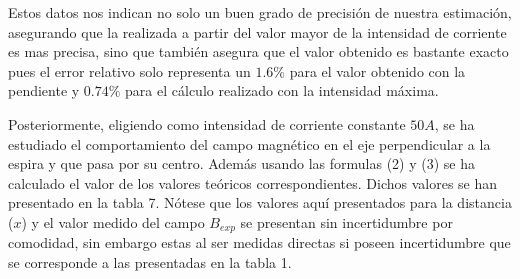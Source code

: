 \documentclass[article, 11pt]{report}
\begin{document}
Estos datos nos indican no solo un buen grado de precisión de nuestra estimación, asegurando que la realizada a partir del valor mayor de la intensidad de corriente es mas precisa, sino que también asegura que el valor obtenido es bastante exacto pues el error relativo solo representa un $1.6\%$ para el valor obtenido con la pendiente y $0.74\%$ para el cálculo realizado con la intensidad máxima. 






Posteriormente, eligiendo como intensidad de corriente constante $50A$, se ha estudiado el comportamiento del campo magnético en el eje perpendicular a la espira y que pasa por su centro. Además usando las formulas (2) y (3) se ha calculado el valor de los valores teóricos correspondientes. Dichos valores se han presentado en la tabla 7. Nótese que los valores aquí presentados para la distancia ($x$) y el valor medido del campo $B_{exp}$ se presentan sin incertidumbre por comodidad, sin embargo estas al ser medidas directas si poseen incertidumbre que se corresponde a las presentadas en la tabla 1.
\end{document}
